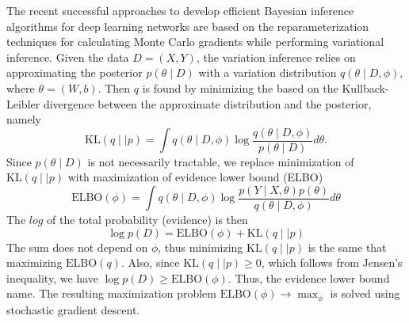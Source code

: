 \documentclass[12pt]{article}
\begin{document}

The recent successful approaches to develop efficient Bayesian inference algorithms for deep learning networks are based on the reparameterization techniques for calculating Monte Carlo gradients while performing  variational inference. Given the data $D = (X,Y)$, the variation inference relies on approximating the posterior $p(\theta \mid D)$ with a variation distribution  $q(\theta \mid D,\phi)$, where $\theta = (W,b)$. Then $q$ is found by minimizing the based on the Kullback-Leibler divergence between the approximate distribution and the posterior, namely
\[
\text{KL}(q \mid\mid p) = \int q(\theta \mid D, \phi)\log \dfrac{q(\theta \mid D, \phi)}{p(\theta\mid D)}d\theta.
\]
Since $p(\theta\mid D)$ is not necessarily tractable, we replace minimization of $\text{KL}(q \mid\mid p) $ with maximization of  evidence lower bound (ELBO)
\[
\text{ELBO}(\phi) = \int q(\theta \mid D,\phi)\log \dfrac{p(Y\mid X,\theta)p(\theta)}{q(\theta \mid D, \phi)}d\theta
\]
The $log$ of the total probability (evidence) is then
\[
\log p(D) =  \text{ELBO}(\phi) + \text{KL}(q \mid\mid p)
\]
The sum does not depend on $\phi$, thus minimizing $\text{KL}(q \mid\mid p)$ is the same that maximizing $\text{ELBO}(q) $. Also, since $\text{KL}(q \mid\mid p) \ge 0$, which follows from Jensen's inequality, we have $\log p(D) \ge  \text{ELBO}(\phi)$. Thus, the  evidence lower bound name.  The resulting maximization problem $\text{ELBO}(\phi) \rightarrow \max_{\phi}$ is solved using stochastic gradient descent. 
\end{document}
